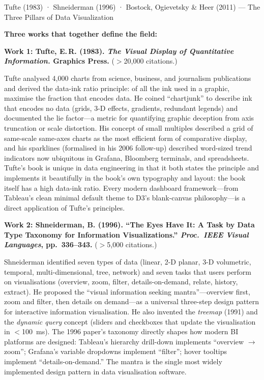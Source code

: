 \begin{researchspotlight}{Tufte (1983) · Shneiderman (1996) · Bostock,
Ogievetsky \& Heer (2011) --- The Three Pillars of Data Visualization}

\textbf{Three works that together define the field:}

\medskip
\textbf{Work 1: Tufte, E.\,R. (1983). \textit{The Visual Display of
Quantitative Information.} Graphics Press.} ($>$20{,}000 citations.)

Tufte analysed 4{,}000 charts from science, business, and journalism
publications and derived the data-ink ratio principle: of all the ink
used in a graphic, maximise the fraction that encodes data. He coined
``chartjunk'' to describe ink that encodes no data (grids, 3-D effects,
gradients, redundant legends) and documented the lie factor---a metric
for quantifying graphic deception from axis truncation or scale distortion.
His concept of small multiples described a grid of same-scale same-axes
charts as the most efficient form of comparative display, and his sparklines
(formalised in his 2006 follow-up) described word-sized trend indicators
now ubiquitous in Grafana, Bloomberg terminals, and spreadsheets. Tufte's
book is unique in data engineering in that it both states the principle and
implements it beautifully in the book's own typography and layout: the book
itself has a high data-ink ratio. Every modern dashboard framework---from
Tableau's clean minimal default theme to D3's blank-canvas philosophy---is
a direct application of Tufte's principles.

\medskip
\textbf{Work 2: Shneiderman, B. (1996). ``The Eyes Have It: A Task by
Data Type Taxonomy for Information Visualizations.'' \textit{Proc.\ IEEE
Visual Languages}, pp.~336--343.} ($>$5{,}000 citations.)

Shneiderman identified seven types of data (linear, 2-D planar,
3-D volumetric, temporal, multi-dimensional, tree, network) and seven
tasks that users perform on visualisations (overview, zoom, filter,
details-on-demand, relate, history, extract). He proposed the
``visual information seeking mantra''---overview first, zoom and filter,
then details on demand---as a universal three-step design pattern for
interactive information visualisation. He also invented the \emph{treemap}
(1991) and the \emph{dynamic query} concept (sliders and checkboxes that
update the visualisation in $<$100~ms). The 1996 paper's taxonomy
directly shapes how modern BI platforms are designed: Tableau's hierarchy
drill-down implements ``overview $\to$ zoom''; Grafana's variable dropdowns
implement ``filter''; hover tooltips implement ``details-on-demand.''
The mantra is the single most widely implemented design pattern in
data visualisation software.


\end{researchspotlight}
